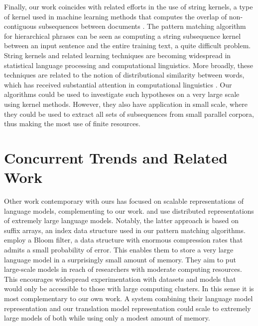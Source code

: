 Finally, our work coincides with related efforts in the use of string kernels, a type of kernel used in machine learning methods that computes the overlap of non-contiguous subsequences between documents \citep{Lodhi:2002:jmlr}.  The pattern matching algorithm for hierarchical phrases can be seen as computing a string subsequence kernel between an input sentence and the entire training text, a quite difficult problem.  String kernels and related learning techniques are becoming widespread in statistical language processing and computational linguistics.  More broadly, these techniques are related to the notion of distributional similarity between words, which has received substantial attention in computational linguistics \citep[e.g.][]{Manning:1999:book,Pereira:1993:acl,Lee:1999:acl}.  Our algorithms could be used to investigate such hypotheses on a very large scale using kernel methods.
However, they also have application in small scale, where they could be used to extract all sets of subsequences from small parallel corpora, thus making the most use of finite resources.

\section{Concurrent Trends and Related Work}\label{sec:lm-scaling}

Other work contemporary with ours has focused on scalable representations
of language models, complementing to our work.  
\citet{Brants:2007:emnlp-conll} and \citet{Zhang:2006:emnlp}
use distributed representations of extremely
large language models.  Notably, the latter approach
is based on suffix arrays, an index data structure
used in our pattern matching algorithms.  
\citet{Talbot:2007:acl,Talbot:2007:emnlp-conll} employ 
a Bloom filter, a data structure
with enormous compression rates that admits a small probability
of error.  This enables them to store a very large language model
in a surprisingly small amount of memory.  They aim to put large-scale models
in reach of researchers with moderate computing resources.  This
encourages widespread experimentation with datasets and models that
would only be accessible to those with large computing clusters.
In this sense it is most complementary to our own work.
A system combining their language model representation and
our translation model representation could scale to extremely
large models of both while using only a modest amount of memory.
